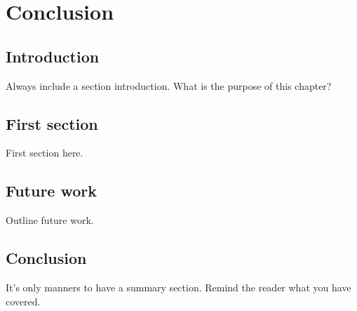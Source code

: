 \chapter{Conclusion}\label{chapter:conclusion}

\section{Introduction}\label{sec:conclusion-intro}
Always include a section introduction. What is the purpose of this chapter?  

\section{First section}\label{sec:conclusion-first-section}
First section here.

\section{Future work}\label{sec:conclusion-future}
Outline future work.

\section{Conclusion}\label{sec:conclusion-conclusion}
It's only manners to have a summary section. Remind the reader what you have covered. 


